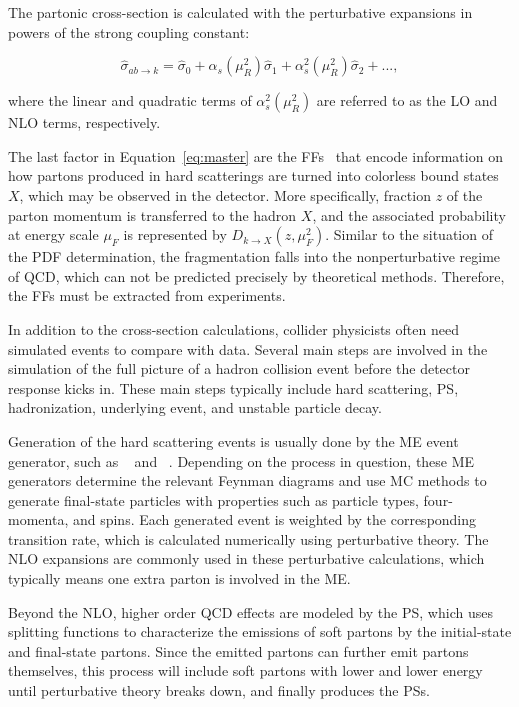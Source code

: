 The partonic cross-section is calculated with the perturbative expansions in powers of the strong coupling constant:

\begin{equation}
\label{eq:expand}
\hat{\sigma}_{ab\rightarrow k}=\hat{\sigma}_{0}+\alpha_{s}(\mu_{R}^2)\hat{\sigma}_{1}+\alpha_{s}^{2}(\mu_{R}^2)\hat{\sigma}_{2}+...,
\end{equation}

where the linear and quadratic terms of $\alpha_{s}^{2}(\mu_{R}^2)$ are referred to as the \ac{LO} and \ac{NLO} terms, respectively. 

The last factor in Equation~\ref{eq:master} are the \acp{FF}~\cite{Field:1976ve} that encode information on how partons produced in hard scatterings are turned into colorless bound states $X$, which may be observed in the detector. More specifically, fraction $z$ of the parton momentum is transferred to the hadron $X$, and the associated probability at energy scale $\mu_{F}$ is represented by $D_{k\rightarrow X}(z,\mu_{F}^2)$. Similar to the situation of the \ac{PDF} determination, the fragmentation falls into the nonperturbative regime of \ac{QCD}, which can not be predicted precisely by theoretical methods. Therefore, the \acp{FF} must be extracted from experiments.  

In addition to the cross-section calculations, collider physicists often need simulated events to compare with data. Several main steps are involved in the simulation of the full picture of a hadron collision event before the detector response kicks in. These main steps typically include hard scattering, \ac{PS}, hadronization, underlying event, and unstable particle decay.

Generation of the hard scattering events is usually done by the \ac{ME} event generator, such as \MG~\cite{Alwall:2014hca} and \Pow~\cite{Frixione:2007vw}. Depending on the process in question, these \ac{ME} generators determine the relevant Feynman diagrams and use \ac{MC} methods to generate final-state particles with properties such as particle types, four-momenta, and spins. Each generated event is weighted by the corresponding transition rate, which is calculated numerically using perturbative theory. The \ac{NLO} expansions are commonly used in these perturbative calculations, which typically means one extra parton is involved in the \ac{ME}.

Beyond the \ac{NLO}, higher order \ac{QCD} effects are modeled by the \ac{PS}, which uses splitting functions to characterize the emissions of soft partons by the initial-state and final-state partons. Since the emitted partons can further emit partons themselves, this process will include soft partons with lower and lower energy until perturbative theory breaks down, and finally produces the \acp{PS}. 

